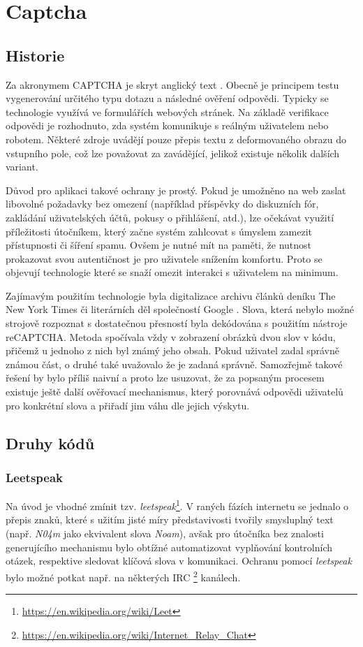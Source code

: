 \documentclass[
  field=ainfp,
  master=true,
  biblatex,
  sourcecodes=false,
  theorems=false,
  glossaries,
  index
]{kidiplom}
\begin{document}
\section{Captcha}
\subsection{Historie}
Za akronymem CAPTCHA je skryt anglický text . Obecně je principem testu vygenerování určitého typu dotazu a následné ověření odpovědi. Typicky se technologie využívá ve formulářích webových stránek. Na základě verifikace odpovědi je rozhodnuto, zda systém komunikuje s reálným uživatelem nebo robotem. Některé zdroje \cite{wiki:CAPTCHA} uvádějí pouze přepis textu z deformovaného obrazu do vstupního pole, což lze považovat za zavádějící, jelikož existuje několik dalších  variant. 

Důvod pro aplikaci takové ochrany je prostý. Pokud je umožněno na web zaslat libovolné požadavky bez omezení (například příspěvky do diskuzních fór, zakládání uživatelských účtů, pokusy o přihlášení, atd.), lze očekávat využití příležitosti útočníkem, který začne systém zahlcovat s úmyslem zamezit přístupnosti či šíření spamu. Ovšem je nutné mít na paměti, že nutnost prokazovat svou autentičnost je pro uživatele snížením komfortu. Proto se objevují technologie které se snaží omezit interakci s uživatelem na minimum. 

Zajímavým použitím technologie byla digitalizace archivu článků deníku The New York Times či literárních děl společností Google \cite{web:techcrunch}. Slova, která nebylo možné strojově rozpoznat s dostatečnou přesností byla dekódována s použitím nástroje reCAPTCHA. Metoda spočívala vždy v zobrazení obrázků dvou slov v kódu, přičemž u jednoho z nich byl známý jeho obsah. Pokud uživatel zadal správně známou část, o druhé také uvažovalo že je zadaná správně. Samozřejmě takové řešení by bylo příliš naivní a proto lze usuzovat, že za popsaným procesem existuje ještě další ověřovací mechanismus, který porovnává odpovědi uživatelů pro konkrétní slova a přiřadí jim váhu dle jejich výskytu. 
\subsection{Druhy kódů}
 
\subsubsection*{Leetspeak} 
Na úvod je vhodné zmínit tzv. \textit{leetspeak}\footnote{\url{https://en.wikipedia.org/wiki/Leet}}. V raných fázích internetu se jednalo o přepis znaků, které s užitím jisté míry představivosti tvořily smysluplný text (např. \textit{N04m} jako ekvivalent slova \textit{Noam}), avšak pro útočníka bez znalosti generujícího mechanismu bylo obtížné automatizovat vyplňování kontrolních otázek, respektive sledovat klíčová slova v komunikaci. Ochranu pomocí \textit{leetspeak} bylo možné potkat např. na některých IRC \footnote{\url{https://en.wikipedia.org/wiki/Internet\_Relay\_Chat}} kanálech.
 
\end{document}
